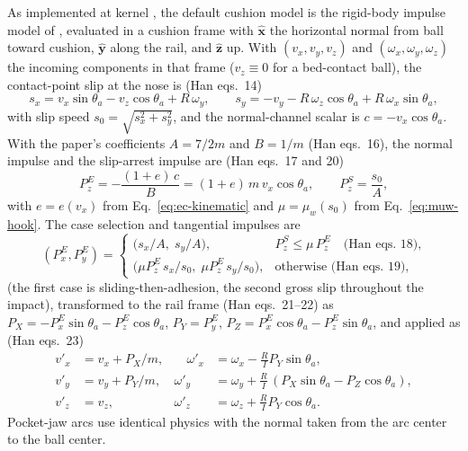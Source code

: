 As implemented at kernel , the default cushion
model is the rigid-body impulse model of \citet{han2005dynamics},
evaluated in a cushion frame with $\hat{\mathbf{x}}$ the horizontal
normal from ball toward cushion, $\hat{\mathbf{y}}$ along the rail,
and $\hat{\mathbf{z}}$ up. With $(v_x, v_y, v_z)$ and
$(\omega_x, \omega_y, \omega_z)$ the incoming components in that frame
($v_z \equiv 0$ for a bed-contact ball), the contact-point slip at the
nose is (Han eqs.~14)
\begin{equation}
s_x = v_x \sin\theta_a - v_z\cos\theta_a + R\,\omega_y, \qquad
s_y = -v_y - R\,\omega_z \cos\theta_a + R\,\omega_x \sin\theta_a,
\label{eq:han-slip}
\end{equation}
with slip speed $s_0 = \sqrt{s_x^2 + s_y^2}$, and the normal-channel
scalar is $c = -v_x \cos\theta_a$. With the paper's coefficients
$A = 7/2m$ and $B = 1/m$ (Han eqs.~16), the normal impulse and the
slip-arrest impulse are (Han eqs.~17 and 20)
\begin{equation}
P_z^{E} = -\frac{(1+e)\,c}{B} = (1+e)\,m\,v_x \cos\theta_a,
\qquad
P_z^{S} = \frac{s_0}{A},
\label{eq:han-impulses}
\end{equation}
with $e = e(v_x)$ from Eq.~\eqref{eq:ec-kinematic} and
$\mu = \mu_w(s_0)$ from Eq.~\eqref{eq:muw-hook}. The case selection
and tangential impulses are
\begin{equation}
(P_x^{E}, P_y^{E}) =
\begin{cases}
\bigl(s_x/A,\; s_y/A\bigr), &
P_z^{S} \le \mu\,P_z^{E} \quad\text{(Han eqs.~18),}\\[4pt]
\bigl(\mu P_z^{E}\,s_x/s_0,\; \mu P_z^{E}\,s_y/s_0\bigr), &
\text{otherwise (Han eqs.~19),}
\end{cases}
\label{eq:han-cases}
\end{equation}
(the first case is sliding-then-adhesion, the second gross slip
throughout the impact), transformed to the rail frame (Han eqs.~21--22) as
$P_X = -P_x^{E}\sin\theta_a - P_z^{E}\cos\theta_a$,
$P_Y = P_y^{E}$,
$P_Z = P_x^{E}\cos\theta_a - P_z^{E}\sin\theta_a$, and applied as
(Han eqs.~23)
\begin{equation}
\begin{aligned}
v'_x &= v_x + P_X/m, &\quad
\omega'_x &= \omega_x - \tfrac{R}{I} P_Y \sin\theta_a,\\
v'_y &= v_y + P_Y/m, &
\omega'_y &= \omega_y + \tfrac{R}{I}\,(P_X \sin\theta_a -
P_Z\cos\theta_a),\\
v'_z &= v_z, &
\omega'_z &= \omega_z + \tfrac{R}{I} P_Y \cos\theta_a .
\end{aligned}
\label{eq:han-update}
\end{equation}
Pocket-jaw arcs use identical physics with the normal taken from the
arc center to the ball center.

